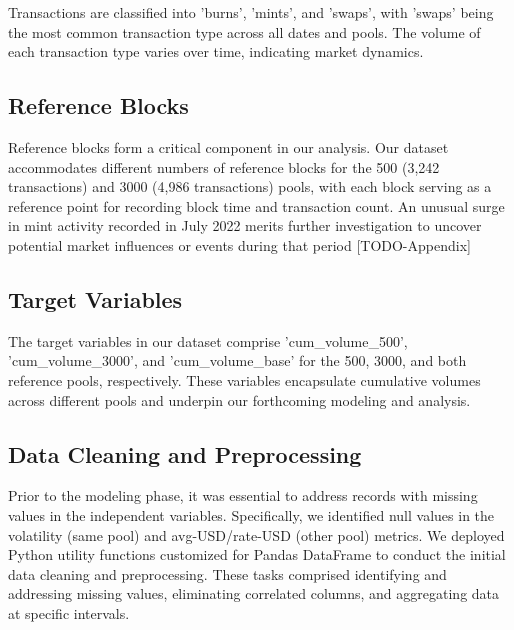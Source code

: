 \documentclass{article}
\begin{document}
Transactions are classified into 'burns', 'mints', and 'swaps', with 'swaps' being the most common transaction type across all dates and pools. The volume of each transaction type varies over time, indicating market dynamics. 

\subsection{Reference Blocks}
Reference blocks form a critical component in our analysis. Our dataset accommodates different numbers of reference blocks for the 500 (3,242 transactions) and 3000 (4,986 transactions) pools, with each block serving as a reference point for recording block time and transaction count. An unusual surge in mint activity recorded in July 2022 merits further investigation to uncover potential market influences or events during that period [TODO-Appendix]

\subsection{Target Variables}
The target variables in our dataset comprise 'cum\_volume\_500', 'cum\_volume\_3000', and 'cum\_volume\_base' for the 500, 3000, and both reference pools, respectively. These variables encapsulate cumulative volumes across different pools and underpin our forthcoming modeling and analysis.

\subsection{Data Cleaning and Preprocessing}
Prior to the modeling phase, it was essential to address records with missing values in the independent variables. Specifically, we identified null values in the volatility (same pool) and avg-USD/rate-USD (other pool) metrics. We deployed Python utility functions customized for Pandas DataFrame to conduct the initial data cleaning and preprocessing. These tasks comprised identifying and addressing missing values, eliminating correlated columns, and aggregating data at specific intervals.
\end{document}
